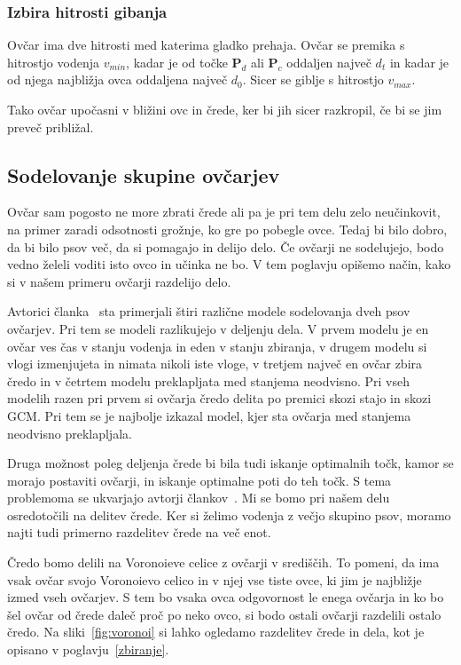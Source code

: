 \subsubsection{Izbira hitrosti gibanja}

Ovčar ima dve hitrosti med katerima gladko prehaja. Ovčar se premika s hitrostjo vodenja $v_{min}$, kadar je od točke $\mathbf{P}_d$ ali $\mathbf{P}_c$ oddaljen največ $d_t$ in kadar je od njega najbližja ovca oddaljena največ $d_0$. Sicer se giblje s hitrostjo $v_{max}$.

Tako ovčar upočasni v bližini ovc in črede, ker bi jih sicer razkropil, če bi se jim preveč približal.

\subsection{Sodelovanje skupine ovčarjev}\label{sodelovanje}

Ovčar sam pogosto ne more zbrati črede ali pa je pri tem delu zelo neučinkovit, na primer zaradi odsotnosti grožnje, ko gre po pobegle ovce. Tedaj bi bilo dobro, da bi bilo psov več, da si pomagajo in delijo delo. Če ovčarji ne sodelujejo, bodo vedno želeli voditi isto ovco in učinka ne bo. V tem poglavju opišemo način, kako si v našem primeru ovčarji razdelijo delo.

Avtorici članka~\cite{aiba2020suggestion} sta primerjali štiri različne modele sodelovanja dveh psov ovčarjev. Pri tem se modeli razlikujejo v deljenju dela. V prvem modelu je en ovčar ves čas v stanju vodenja in eden v stanju zbiranja, v drugem modelu si vlogi izmenjujeta in nimata nikoli iste vloge, v tretjem največ en ovčar zbira čredo in v četrtem modelu preklapljata med stanjema neodvisno. Pri vseh modelih razen pri prvem si ovčarja čredo delita po premici skozi stajo in skozi GCM. Pri tem se je najbolje izkazal model, kjer sta ovčarja med stanjema neodvisno preklapljala.

Druga možnost poleg deljenja črede bi bila tudi iskanje optimalnih točk, kamor se morajo postaviti ovčarji, in iskanje optimalne poti do teh točk. S tema problemoma se ukvarjajo avtorji člankov~\cite{lee2017autonomous, lien2005shepherding, pierson2015bio, pierson2017controlling}. Mi se bomo pri našem delu osredotočili na delitev črede. Ker si želimo vodenja z večjo skupino psov, moramo najti tudi primerno razdelitev črede na več enot.

Čredo bomo delili na Voronoieve celice z ovčarji v središčih. To pomeni, da ima vsak ovčar svojo Voronoievo celico in v njej vse tiste ovce, ki jim je najbližje izmed vseh ovčarjev. S tem bo vsaka ovca odgovornost le enega ovčarja in ko bo šel ovčar od črede daleč proč po neko ovco, si bodo ostali ovčarji razdelili ostalo čredo. Na sliki~\ref{fig:voronoi} si lahko ogledamo razdelitev črede in dela, kot je opisano v poglavju~\ref{zbiranje}.

